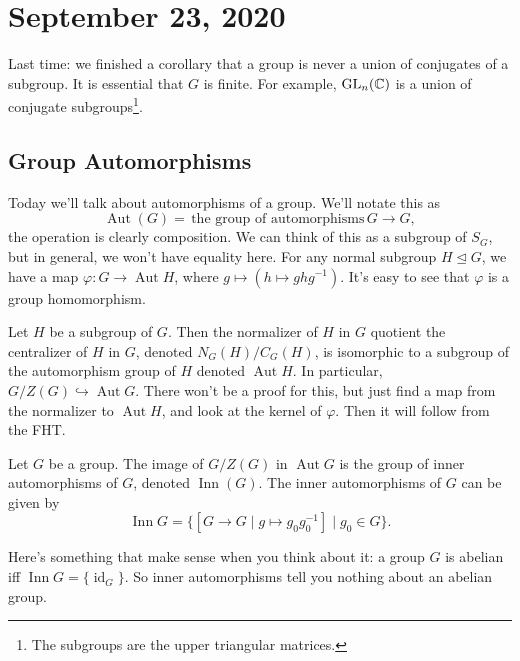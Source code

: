 \section{September 23, 2020}
Last time: we finished a corollary that a group is never a union of conjugates of a subgroup. It is essential that $G$ is finite. For example, $\operatorname{GL}_n(\mathbb{C})$ is a union of conjugate subgroups\footnote{The subgroups are the upper triangular matrices.}.
\subsection{Group Automorphisms}
Today we'll talk about automorphisms of a group. We'll notate this as \[
    \operatorname{Aut}(G)=\,\text{the group of automorphisms}\, G\to G,
\] the operation is clearly composition. We can think of this as a subgroup of $S_G$, but in general, we won't have equality here. For any normal subgroup $H\trianglelefteq G$, we have a map $\varphi  \colon G \to \operatorname{Aut}H$, where $g\mapsto (h\mapsto ghg^{-1})$. It's easy to see that $\varphi $ is a group homomorphism.
\begin{prop}
    Let $H$ be a subgroup of $G$. Then the normalizer of $H$ in $G$ quotient the centralizer of $H$ in $G$, denoted $N_G(H) / C_G(H)$, is isomorphic to a subgroup of the automorphism group of $H$ denoted $\operatorname{Aut}H$. In particular, $G /Z(G) \hookrightarrow \operatorname{Aut}G$. There won't be a proof for this, but just find a map from the normalizer to $\operatorname{Aut}H$, and look at the kernel of $\varphi $. Then it will follow from the FHT.
\end{prop}
\begin{definition}[]
    Let $G$ be a group. The image of $G /Z(G)$ in $ \operatorname{Aut}G$ is the group of inner automorphisms of $G$, denoted $\operatorname{Inn}(G)$. The inner automorphisms of $G$ can be given by \[ 
        \operatorname{Inn}G=\{[G\to G \mid g\mapsto g_0g_0^{-1}] \mid g_0\in G\} .
    \] 
\end{definition}
Here's something that make sense when you think about it: a group $G$ is abelian iff $\operatorname{Inn}G=\{\operatorname{id}_G\} $. So inner automorphisms tell you nothing about an abelian group.
